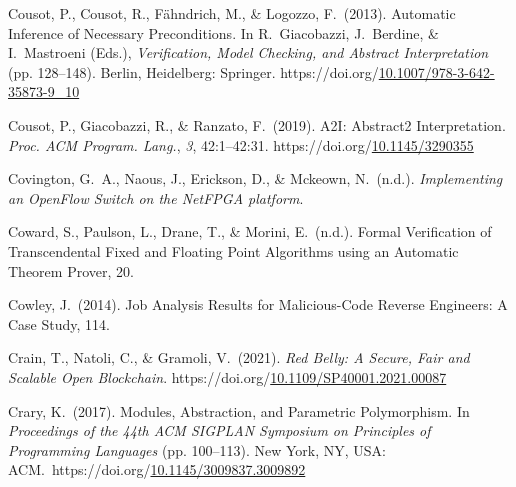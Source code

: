 \documentclass[12pt,twoside]{article}
\begin{document}
{\begin{thebibliography}{1079}
\mdbibitemlabel{}Cousot, P., Cousot, R., Fähndrich, M., \& Logozzo, F.~(2013). Automatic Inference of Necessary Preconditions. In R.~Giacobazzi, J.~Berdine, \& I.~Mastroeni (Eds.), \emph{Verification, Model Checking, and Abstract Interpretation} (pp. 128–148). Berlin, Heidelberg: Springer. https://doi.org/\href{https://dx.doi.org/10.1007/978-3-642-35873-9_10}{10.1007/978-3-642-35873-9\_10}%

\mdbibitemlabel{}Cousot, P., Giacobazzi, R., \& Ranzato, F.~(2019). A2I: Abstract2 Interpretation. \emph{Proc. ACM Program. Lang.}, \emph{3}, 42:1–42:31. https://doi.org/\href{https://dx.doi.org/10.1145/3290355}{10.1145/3290355}%

\mdbibitemlabel{}Covington, G.~A., Naous, J., Erickson, D., \& Mckeown, N.~(n.d.). \emph{Implementing an OpenFlow Switch on the NetFPGA platform}.%

\mdbibitemlabel{}Coward, S., Paulson, L., Drane, T., \& Morini, E.~(n.d.). Formal Veriﬁcation of Transcendental Fixed and Floating Point Algorithms using an Automatic Theorem Prover, 20.%

\mdbibitemlabel{}Cowley, J.~(2014). Job Analysis Results for Malicious-Code Reverse Engineers: A Case Study, 114.%

\mdbibitemlabel{}Crain, T., Natoli, C., \& Gramoli, V.~(2021). \emph{Red Belly: A Secure, Fair and Scalable Open Blockchain}. https://doi.org/\href{https://dx.doi.org/10.1109/SP40001.2021.00087}{10.1109/SP40001.2021.00087}%

\mdbibitemlabel{}Crary, K.~(2017). Modules, Abstraction, and Parametric Polymorphism. In \emph{Proceedings of the 44th ACM SIGPLAN Symposium on Principles of Programming Languages} (pp. 100–113). New York, NY, USA: ACM.~https://doi.org/\href{https://dx.doi.org/10.1145/3009837.3009892}{10.1145/3009837.3009892}%


\end{thebibliography}}
\end{document}
